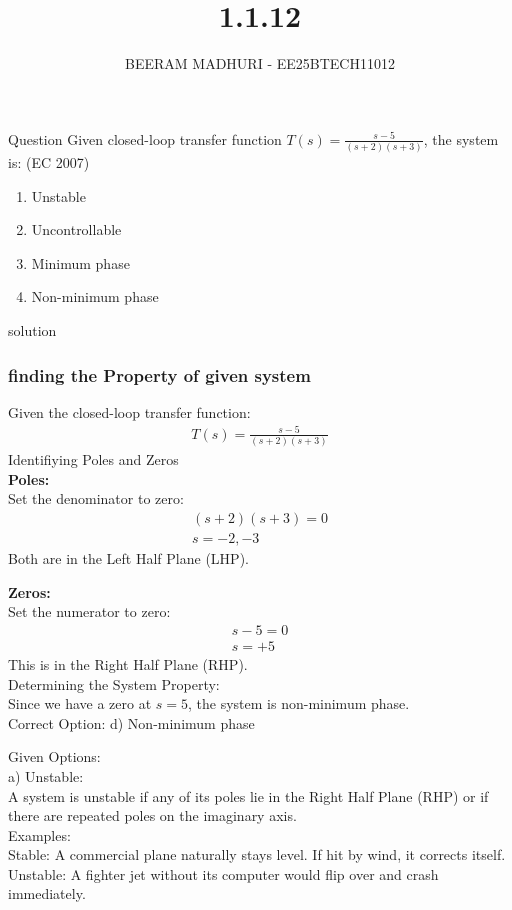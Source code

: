 \documentclass{beamer}
\title %
{1.1.12}
\author %
{BEERAM MADHURI - EE25BTECH11012}
\begin{document}
\frame{\titlepage}
\begin{frame}{Question}
Given closed-loop transfer function $T(s) = \frac{s-5}{(s+2)(s+3)}$, the system is: \hfill (EC 2007)

\begin{enumerate}
    \item[a)] Unstable
    \item[b)] Uncontrollable
    \item[c)] Minimum phase
    \item[d)] Non-minimum phase
\end{enumerate}
\end{frame}

\begin{frame}{solution}
    \frametitle{finding the Property of given system}
Given the closed-loop transfer function:
\begin{align}
    T(s) = \frac{s - 5}{(s + 2)(s + 3)}
\end{align}
Identifiying Poles and Zeros\\
\textbf{Poles:}\\
Set the denominator to zero: \\
\begin{align}
    (s + 2)(s + 3) = 0\\
    s = -2 ,-3
\end{align}
 Both are in the Left Half Plane (LHP).
\end{frame}
\begin{frame}
    \textbf{Zeros:}\\
Set the numerator to zero: 
\begin{align}{}
    s - 5 = 0\\
    s = +5
\end{align}
This is in the Right Half Plane (RHP).\\

Determining the System Property:\\
Since we have a zero at $s = 5$, the system is non-minimum phase.\\
Correct Option: d) Non-minimum phase
\end{frame}
\begin{frame}{}
    Given Options:\\
a) Unstable:\\
A system is unstable if any of its poles lie in the Right Half Plane (RHP) or if there are repeated poles on the imaginary axis.\\
Examples:\\
Stable: A commercial plane naturally stays level. If hit by wind, it corrects itself.\\
Unstable: A fighter jet without its computer would flip over and crash immediately.\\

\end{frame}
\end{document}
